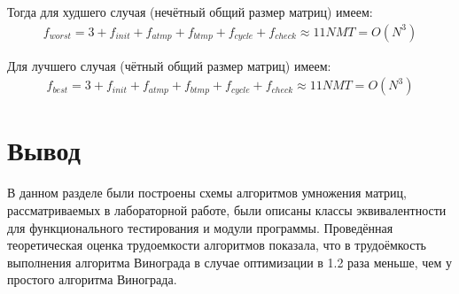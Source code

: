 Тогда для худшего случая (нечётный общий размер матриц) имеем:
\begin{equation}
	\label{сomplexity:vinograd_opt_worst}
	\begin{aligned}
		f_{worst} = 3 + f_{init} + f_{atmp} + f_{btmp} + f_{cycle} + f_{check} \approx 11NMT = O(N^3)
	\end{aligned}
\end{equation}

Для лучшего случая (чётный общий размер матриц) имеем:
\begin{equation}
	\label{сomplexity:vinograd_opt_best}
	\begin{aligned}
		f_{best} = 3 + f_{init} + f_{atmp} + f_{btmp} + f_{cycle} + f_{check} \approx 11NMT = O(N^3)
	\end{aligned}
\end{equation}

\section*{Вывод}

В данном разделе были построены схемы алгоритмов умножения матриц,
рассматриваемых в лабораторной работе, были описаны классы эквивалентности для функционального тестирования и модули программы. Проведённая теоретическая оценка трудоемкости алгоритмов показала, что в трудоёмкость выполнения алгоритма Винограда в случае оптимизации в 1.2 раза меньше, чем у простого алгоритма Винограда.